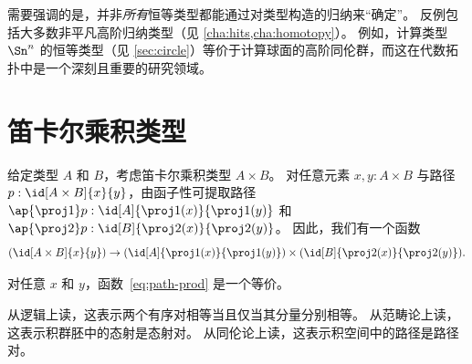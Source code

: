 需要强调的是，并非\emph{所有}恒等类型都能通过对类型构造的归纳来“确定”。
反例包括大多数非平凡高阶归纳类型（见 \cref{cha:hits,cha:homotopy}）。
例如，计算类型 $\Sn^n$ 的恒等类型（见 \cref{sec:circle}）等价于计算球面的高阶同伦群，而这在代数拓扑中是一个深刻且重要的研究领域。

\section{笛卡尔乘积类型}
\label{sec:compute-cartprod}

%
给定类型 $A$ 和 $B$，考虑笛卡尔乘积类型 $A \times B$。
对任意元素 $x,y:A\times B$ 与路径 $p:\id[A\times B]{x}{y}$，由函子性可提取路径 $\ap{\proj1}p:\id[A]{\proj1(x)}{\proj1(y)}$ 和 $\ap{\proj2}p:\id[B]{\proj2(x)}{\proj2(y)}$。
因此，我们有一个函数
\begin{equation}\label{eq:path-prod}
  (\id[A\times B]{x}{y}) \to (\id[A]{\proj1(x)}{\proj1(y)}) \times (\id[B]{\proj2(x)}{\proj2(y)}).
\end{equation}

\begin{thm}\label{thm:path-prod}
  对任意 $x$ 和 $y$，函数~\eqref{eq:path-prod} 是一个等价。
\end{thm}

从逻辑上读，这表示两个有序对相等当且仅当其分量分别相等。
从范畴论上读，这表示积群胚中的态射是态射对。
从同伦论上读，这表示积空间中的路径是路径对。

